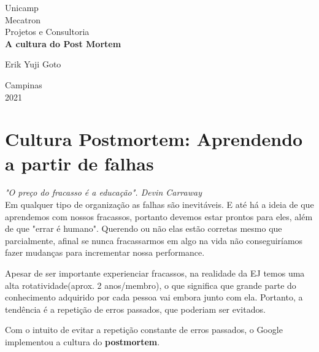 \documentclass[a4paper, 12pt]{article}
\begin{document}
	\begin{titlepage} %
		\begin{center} %
			{\large Unicamp}\\[0.2cm] %
			{\large Mecatron}\\[0.2cm] %
			{\large Projetos e Consultoria}\\[3.2cm]
			{\bf \huge A cultura do Post Mortem}\\[5.1cm] %
		\end{center} %
		{\large Erik Yuji Goto}\\[10.5cm] %

		\begin{center}
			{\large Campinas}\\[0.2cm]
			{\large 2021}
		\end{center}
	\end{titlepage} %
	
	\tableofcontents
	
	\newpage
	\section{Cultura Postmortem: Aprendendo a partir de falhas}
	\textit{"O preço do fracasso é a educação". Devin Carraway}\\
	
	Em qualquer tipo de organização as falhas são inevitáveis. E até há a ideia de que aprendemos com nossos fracassos, portanto devemos estar prontos para eles, além de que "errar é humano". Querendo ou não elas estão corretas mesmo que
	 parcialmente, afinal se nunca fracassarmos em algo na vida não conseguiríamos fazer mudanças para incrementar nossa performance.
	
	Apesar de ser importante experienciar fracassos, na realidade da EJ temos uma alta rotatividade(aprox. 2 anos/membro), o que significa que grande parte do conhecimento adquirido por cada pessoa vai embora junto com ela. Portanto, a tendência é a repetição de erros passados, que poderiam ser evitados.
	
	Com o intuito de evitar a repetição constante de erros passados, o Google implementou a cultura do \textbf{postmortem}.
	
\end{document}
